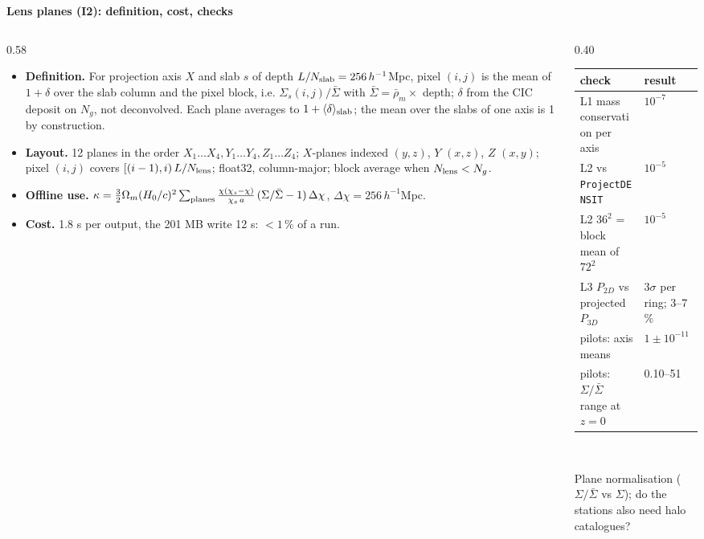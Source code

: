 \documentclass[UTF8]{beamer}
\newcommand{\examplebox}[2]{%
  \begin{tcolorbox}[colframe=darkcardinal,colback=boxgray,title=#1]
    #2
  \end{tcolorbox}
}
\begin{document}
\begin{frame}{\textbf{Lens planes (I2): definition, cost, checks}}
  \footnotesize
  \begin{columns}[T]
    \begin{column}{0.58\textwidth}
      \begin{itemize}
        \item \textbf{Definition.} For projection axis $X$ and slab $s$ of depth $L/N_{\rm slab} = 256\,h^{-1}$Mpc, pixel
          $(i,j)$ is the mean of $1+\delta$ over the slab column and the pixel block, i.e. $\Sigma_s(i,j)/\bar\Sigma$ with
          $\bar\Sigma = \bar\rho_m\times$ depth; $\delta$ from the CIC deposit on $N_g$, not deconvolved. Each plane
          averages to $1 + \langle\delta\rangle_{\rm slab}$; the mean over the slabs of one axis is 1 by construction.
        \item \textbf{Layout.} 12 planes in the order $X_1\ldots X_4, Y_1\ldots Y_4, Z_1\ldots Z_4$; $X$-planes indexed
          $(y, z)$, $Y$ $(x, z)$, $Z$ $(x, y)$; pixel $(i,j)$ covers $[(i-1), i)\,L/N_{\rm lens}$; float32,
          column-major; block average when $N_{\rm lens} < N_g$.
        \item \textbf{Offline use.} $\kappa = \tfrac{3}{2}\Omega_m (H_0/c)^2 \sum_{\rm planes}
          \frac{\chi(\chi_s-\chi)}{\chi_s\,a}\,(\Sigma/\bar\Sigma - 1)\,\Delta\chi$, $\Delta\chi = 256\,h^{-1}$Mpc.
        \item \textbf{Cost.} 1.8 s per output, the 201 MB write 12 s: $< 1\,\%$ of a run.
      \end{itemize}
    \end{column}
    \begin{column}{0.40\textwidth}
      \scriptsize
      \begin{tabular}{@{}ll@{}}
        \toprule
        check & result \\
        \midrule
        L1 mass conservation per axis & $10^{-7}$ \\
        L2 vs \texttt{ProjectDENSIT} & $10^{-5}$ \\
        L2 $36^2$ = block mean of $72^2$ & $10^{-5}$ \\
        L3 $P_{2D}$ vs projected $P_{3D}$ & $3\sigma$ per ring; 3--7\,\% \\
        pilots: axis means & $1 \pm 10^{-11}$ \\
        pilots: $\Sigma/\bar\Sigma$ range at $z = 0$ & 0.10--51 \\
        \bottomrule
      \end{tabular}
      \\[1ex]
      \examplebox{Open question for Baojiu}{%
        \scriptsize Plane normalisation ($\Sigma/\bar\Sigma$ vs $\Sigma$); do the stations also need halo catalogues?
      }
    \end{column}
  \end{columns}
\end{frame}
\end{document}
